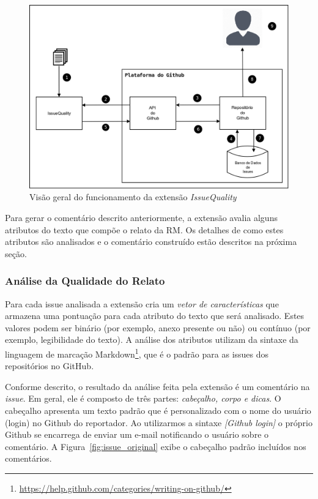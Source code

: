 \begin{figure}[htpb]
    \centering
    \includegraphics[width=0.7\linewidth]{chapter-implementacao-extensoes-fgrm/img/diagrama_funcionamento_issuequality.png}
    \caption{Visão geral do funcionamento da extensão \textit{IssueQuality}}
\label{fig:diagrama_funcionamento_issuequality}
\end{figure}

Para gerar o comentário descrito anteriormente, a extensão avalia alguns
atributos do texto que compõe o relato da RM\@. Os detalhes de como estes
atributos são analisados e o comentário construído estão descritos na próxima
seção.

\subsubsection{Análise da Qualidade do Relato}
\label{ssub:implementacao_extensao_analise_qualidade_do_relato}

Para cada issue analisada a extensão cria um \textit{vetor de características}
que armazena uma pontuação para cada atributo do texto que será analisado. Estes
valores podem ser binário (por exemplo, anexo presente ou não) ou contínuo (por
exemplo, legibilidade do texto). A análise dos atributos utilizam da sintaxe da
linguagem de marcação
Markdown\footnote{\url{https://help.github.com/categories/writing-on-github/}},
que é o padrão para as issues dos repositórios no GitHub.

Conforme descrito, o resultado da análise feita pela extensão é um comentário na
\textit{issue}. Em geral, ele é composto de três partes: \textit{cabeçalho,
    corpo e dicas}. O cabeçalho apresenta um texto padrão que é personalizado
com o nome do usuário (login) no Github do reportador. Ao utilizarmos a sintaxe
\textit{\@[Github login]} o próprio Github se encarrega de enviar um e-mail
notificando o usuário sobre o comentário. A Figura~\ref{fig:issue_original}
exibe o cabeçalho padrão incluídos nos comentários.

